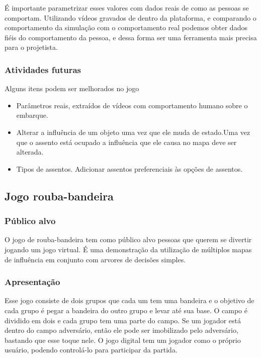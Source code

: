 \documentclass[a4paper]{article}
\begin{document}
É importante parametrizar esses valores com dados reais de como as pessoas se comportam. Utilizando vídeos gravados de dentro da plataforma, e comparando o comportamento da simulação com o comportamento real podemos obter dados fiéis do comportamento da pessoa, e dessa forma ser uma ferramenta mais precisa para o projetista.

\subsubsection{Atividades futuras}

Alguns itens podem ser melhorados no jogo

\begin{itemize}
\item Parâmetros reais, extraídos de vídeos com comportamento humano sobre o embarque.
\item Alterar a influência de um objeto uma vez que ele muda de estado.Uma vez que o assento está ocupado a influência que ele causa no mapa deve ser alterada.
\item Tipos de assentos. Adicionar assentos preferenciais às opções de assentos.
\end{itemize}

\subsection{Jogo rouba-bandeira}

\subsubsection{Público alvo}

O jogo de rouba-bandeira tem como público alvo pessoas que querem se divertir jogando um jogo virtual. É uma demonstração da utilização de múltiplos mapas de influência em conjunto com arvores de decisões simples.

\subsubsection{Apresentação}
Esse jogo consiste de dois grupos que cada um tem uma bandeira e o objetivo de cada grupo é pegar a bandeira do outro grupo e levar até sua base. O campo é dividido em dois e cada grupo tem uma parte do campo. Se um jogador está dentro do campo adversário, então ele pode ser imobilizado pelo adversário, bastando que esse toque nele.
O jogo digital tem um jogador como o próprio usuário, podendo controlá-lo para participar da partida.
\end{document}

